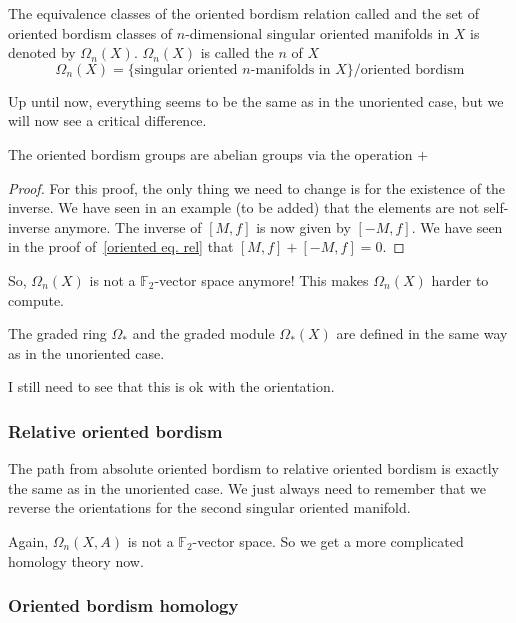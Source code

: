 \documentclass[a4paper,11pt]{article}
\begin{document}
\begin{definition}
    The equivalence classes of the oriented bordism relation called  and the set of oriented bordism classes of \(n\)-dimensional singular oriented manifolds in \(X\) is denoted by \(\Omega_n(X)\). \(\Omega_n(X)\) is called the \(n\) of \(X\)
    \[\Omega_n(X)=\{\text{singular oriented \(n\)-manifolds in } X\}\big/\text{oriented bordism}\]
\end{definition}

Up until now, everything seems to be the same as in the unoriented case, but we will now see a critical difference.

\begin{theorem}
    The oriented bordism groups are abelian groups via the operation \(+\)
\end{theorem}

\begin{proof}
    For this proof, the only thing we need to change is for the existence of the inverse. We have seen in an example (to be added) that the elements are not self-inverse anymore. The inverse of \([M,f]\) is now given by \([-M,f]\). We have seen in the proof of\ \ref{oriented eq. rel} that \([M,f]+[-M,f]=0\).
\end{proof}

So, \(\Omega_n(X)\) is not a \(\mathbb{F}_2\)-vector space anymore! This makes \(\Omega_n(X)\) harder to compute.

The graded ring \(\Omega_\ast\) and the graded module \(\Omega_\ast(X)\) are defined in the same way as in the unoriented case.

I still need to see that this is ok with the orientation.

\subsubsection{Relative oriented bordism}

The path from absolute oriented bordism to relative oriented bordism is exactly the same as in the unoriented case. We just always need to remember that we reverse the orientations for the second singular oriented manifold.

Again, \(\Omega_n(X,A)\) is not a \(\mathbb{F}_2\)-vector space. So we get a more complicated homology theory now.

\subsubsection{Oriented bordism homology}
\end{document}
